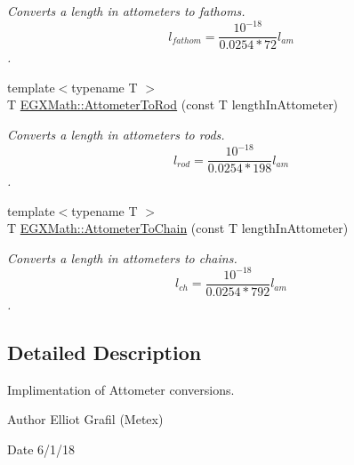 \begin{DoxyCompactItemize}
\begin{DoxyCompactList}\small\item\em Converts a length in attometers to fathoms. \[ l_{fathom}= \frac{10^{-18}}{0.0254 * 72} l_{am} \]. \end{DoxyCompactList}\item 
{\footnotesize template$<$typename T $>$ }\\T \mbox{\hyperlink{group___e_g_x_math-_conversions-_length_conversions-_s_i-_attometer-_surveyors_ga4bdcb3e42e19c5f1ca38ee513654dfa4}{E\+G\+X\+Math\+::\+Attometer\+To\+Rod}} (const T length\+In\+Attometer)
\begin{DoxyCompactList}\small\item\em Converts a length in attometers to rods. \[ l_{rod}= \frac{10^{-18}}{0.0254 * 198} l_{am} \]. \end{DoxyCompactList}\item 
{\footnotesize template$<$typename T $>$ }\\T \mbox{\hyperlink{group___e_g_x_math-_conversions-_length_conversions-_s_i-_attometer-_surveyors_gab0d950b7446370314d85395a073f2e73}{E\+G\+X\+Math\+::\+Attometer\+To\+Chain}} (const T length\+In\+Attometer)
\begin{DoxyCompactList}\small\item\em Converts a length in attometers to chains. \[ l_{ch}= \frac{10^{-18}}{0.0254 * 792} l_{am} \]. \end{DoxyCompactList}\end{DoxyCompactItemize}


\subsection{Detailed Description}
Implimentation of Attometer conversions. 

\begin{DoxyAuthor}{Author}
Elliot Grafil (Metex) 
\end{DoxyAuthor}
\begin{DoxyDate}{Date}
6/1/18 
\end{DoxyDate}

